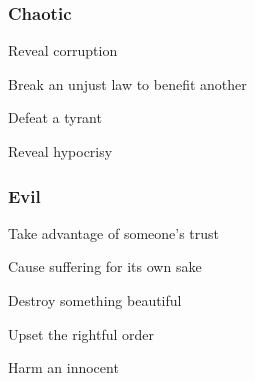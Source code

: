 \subsubsection{Chaotic}   
 
\startitemize[1,packed]

\item Reveal corruption

 
\item Break an unjust law to benefit another

 
\item Defeat a tyrant

 
\item Reveal hypocrisy


\stopitemize
 
\subsubsection{Evil}   
 
\startitemize[1,packed]

\item Take advantage of someone's trust

 
\item Cause suffering for its own sake

 
\item Destroy something beautiful

 
\item Upset the rightful order

 
\item Harm an innocent


\stopitemize
 






